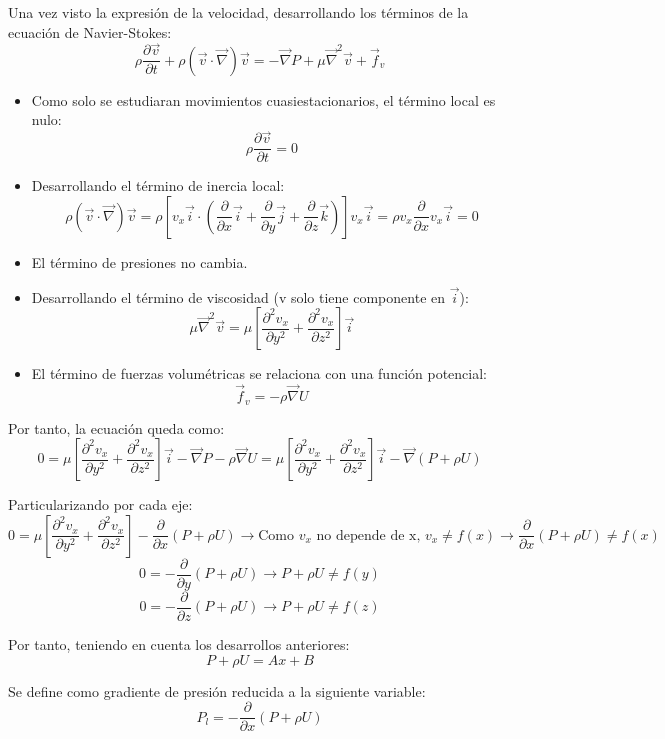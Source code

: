 Una vez visto la expresión de la velocidad, desarrollando los términos de la ecuación de Navier-Stokes:
\[\rho\dfrac{\partial \vec{v}}{\partial t}
+
 \rho\left(\vec{v}\cdot\vec{\nabla}\right)\vec{v}
=
-
\vec{\nabla}P
+
 \mu\vec{\nabla}^2\vec{v} 
+
\vec{f}_v\]


\begin{itemize}
	\item Como solo se estudiaran movimientos cuasiestacionarios, el término local es nulo:
	\[\rho\dfrac{\partial \vec{v}}{\partial t}=0\]
	\item Desarrollando el término de inercia local:
	\[\rho\left(\vec{v}\cdot\vec{\nabla}\right)\vec{v}= \rho \left[v_x\vec{i}\cdot 
	\left(\dfrac{\partial}{\partial x}\vec{i}+\dfrac{\partial}{\partial y}\vec{j}+\dfrac{\partial}{\partial z}\vec{k}\right)\right]v_x\vec{i}=
	\rho v_x \dfrac{\partial}{\partial x} v_x \vec{i}=0\]
	\item El término de presiones no cambia.
	\item Desarrollando el término de viscosidad (v solo tiene componente en $\vec{i}$):
	\[\mu\vec{\nabla}^2\vec{v}=\mu\left[\dfrac{\partial^2 v_x}{\partial y^2}+\dfrac{\partial^2 v_x}{\partial z^2}\right]\vec{i}\]	
	\item El término de fuerzas volumétricas se relaciona con una función potencial:
	\[\vec{f}_v=-\rho\vec{\nabla}U\]
\end{itemize}


Por tanto, la ecuación queda como:
\[0=\mu\left[\dfrac{\partial^2 v_x}{\partial y^2}+\dfrac{\partial^2 v_x}{\partial z^2}\right]\vec{i}
-
\vec{\nabla}P
-\rho\vec{\nabla}U= \mu\left[\dfrac{\partial^2 v_x}{\partial y^2}+\dfrac{\partial^2 v_x}{\partial z^2}\right]\vec{i} -\vec{\nabla}\left(P+\rho U\right)\]

Particularizando por cada eje:
\[0=\mu\left[\dfrac{\partial^2 v_x}{\partial y^2}+\dfrac{\partial^2 v_x}{\partial z^2}\right]-\dfrac{\partial}{\partial x}\left(P+\rho U\right) \rightarrow \text{Como $v_x$ no depende de x, $v_x\ne f(x)$}\rightarrow  \dfrac{\partial}{\partial x}\left(P+\rho U\right) \ne f(x)\]
\[0=-\dfrac{\partial}{\partial y}\left(P+\rho U\right) \rightarrow P+\rho U \ne f(y)\]
\[0=-\dfrac{\partial}{\partial z}\left(P+\rho U\right) \rightarrow P+\rho U \ne f(z)\]


Por tanto, teniendo en cuenta los desarrollos anteriores:
\[P+\rho U = Ax+B\]


Se define como gradiente de presión reducida a la siguiente variable:
\[P_l=-\dfrac{\partial}{\partial x}\left(P+\rho U\right) \]
